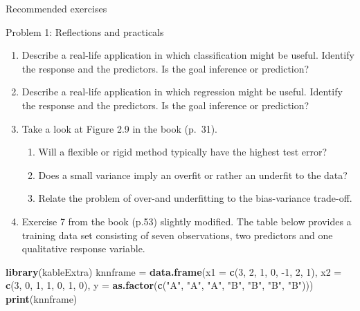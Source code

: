 \documentclass[ignorenonframetext,]{beamer}
\newenvironment{Shaded}{\begin{snugshade}}{\end{snugshade}}
\newcommand{\KeywordTok}[1]{\textcolor[rgb]{0.13,0.29,0.53}{\textbf{#1}}}
\newcommand{\DataTypeTok}[1]{\textcolor[rgb]{0.13,0.29,0.53}{#1}}
\newcommand{\DecValTok}[1]{\textcolor[rgb]{0.00,0.00,0.81}{#1}}
\newcommand{\StringTok}[1]{\textcolor[rgb]{0.31,0.60,0.02}{#1}}
\newcommand{\NormalTok}[1]{#1}
\providecommand{\tightlist}{%
  \setlength{\itemsep}{0pt}\setlength{\parskip}{0pt}}
\begin{document}
\begin{frame}[fragile]{Recommended exercises}

\begin{block}{Problem 1: Reflections and practicals}

\begin{enumerate}
\def\labelenumi{\arabic{enumi}.}
\item
  Describe a real-life application in which classification might be
  useful. Identify the response and the predictors. Is the goal
  inference or prediction?
\item
  Describe a real-life application in which regression might be useful.
  Identify the response and the predictors. Is the goal inference or
  prediction?
\item
  Take a look at Figure 2.9 in the book (p.~31).

  \begin{enumerate}
  \def\labelenumii{\alph{enumii}.}
  \tightlist
  \item
    Will a flexible or rigid method typically have the highest test
    error?
  \item
    Does a small variance imply an overfit or rather an underfit to the
    data?
  \item
    Relate the problem of over-and underfitting to the bias-variance
    trade-off.
  \end{enumerate}
\item
  Exercise 7 from the book (p.53) slightly modified. The table below
  provides a training data set consisting of seven observations, two
  predictors and one qualitative response variable.
\end{enumerate}

\begin{Shaded}
\begin{Highlighting}[]
\KeywordTok{library}\NormalTok{(kableExtra)}
\NormalTok{knnframe =}\StringTok{ }\KeywordTok{data.frame}\NormalTok{(}\DataTypeTok{x1 =} \KeywordTok{c}\NormalTok{(}\DecValTok{3}\NormalTok{, }\DecValTok{2}\NormalTok{, }\DecValTok{1}\NormalTok{, }\DecValTok{0}\NormalTok{, }\DecValTok{-1}\NormalTok{, }\DecValTok{2}\NormalTok{, }\DecValTok{1}\NormalTok{), }\DataTypeTok{x2 =} \KeywordTok{c}\NormalTok{(}\DecValTok{3}\NormalTok{, }\DecValTok{0}\NormalTok{, }\DecValTok{1}\NormalTok{, }\DecValTok{1}\NormalTok{, }
    \DecValTok{0}\NormalTok{, }\DecValTok{1}\NormalTok{, }\DecValTok{0}\NormalTok{), }\DataTypeTok{y =} \KeywordTok{as.factor}\NormalTok{(}\KeywordTok{c}\NormalTok{(}\StringTok{"A"}\NormalTok{, }\StringTok{"A"}\NormalTok{, }\StringTok{"A"}\NormalTok{, }\StringTok{"B"}\NormalTok{, }\StringTok{"B"}\NormalTok{, }\StringTok{"B"}\NormalTok{, }\StringTok{"B"}\NormalTok{)))}
\KeywordTok{print}\NormalTok{(knnframe)}
\end{Highlighting}
\end{Shaded}


\end{block}
\end{frame}
\end{document}
